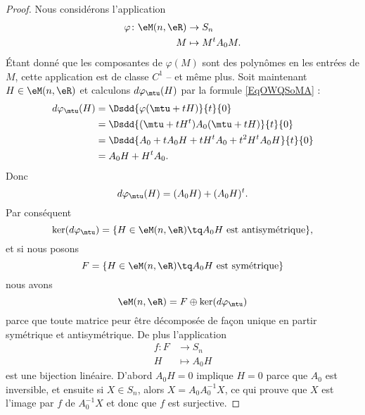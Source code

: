 \begin{proof}
    Nous considérons l'application
    \begin{equation}
        \begin{aligned}
            \varphi\colon \eM(n,\eR)&\to S_n \\
            M&\mapsto M^tA_0M.
        \end{aligned}
    \end{equation}
    Étant donné que les composantes de \( \varphi(M)\) sont des polynômes en les entrées de \( M\), cette application est de classe \( C^1\) -- et même plus. Soit maintenant \( H\in \eM(n,\eR)\) et calculons \( d\varphi_{\mtu}(H)\) par la formule \eqref{EqOWQSoMA} :
    \begin{subequations}
        \begin{align}
            d\varphi_{\mtu}(H)&=\Dsdd{ \varphi(\mtu+tH) }{t}{0}\\
            &=\Dsdd{ (\mtu+tH^t)A_0(\mtu+tH) }{t}{0}\\
            &=\Dsdd{ A_0+tA_0H+tH^tA_0+t^2H^tA_0H }{t}{0}\\
            &=A_0H+H^tA_0.
        \end{align}
    \end{subequations}
    Donc
    \begin{equation}
        d\varphi_{\mtu}(H)=(A_0H)+(A_0H)^t.
    \end{equation}
    Par conséquent
    \begin{equation}
        \ker(d\varphi_{\mtu})=\{ H\in \eM(n,\eR)\tq A_0H\text{ est antisymétrique} \},
    \end{equation}
    et si nous posons
    \begin{equation}
        F=\{ H\in \eM(n,\eR)\tq A_0H\text{ est symétrique} \}
    \end{equation}
    nous avons
    \begin{equation}
        \eM(n,\eR)=F\oplus\ker(d\varphi_{\mtu})
    \end{equation}
    parce que toute matrice peur être décomposée de façon unique en partir symétrique et antisymétrique. De plus l'application
    \begin{equation}    \label{EqGTBusDm}
        \begin{aligned}
            f\colon F&\to S_n \\
            H&\mapsto A_0H
        \end{aligned}
    \end{equation}
    est une bijection linéaire. D'abord \( A_0H=0\) implique \( H=0\) parce que \( A_0\) est inversible, et ensuite si \( X\in S_n\), alors \( X=A_0A_0^{-1}X\), ce qui prouve que \( X\) est l'image par \( f\) de \( A_0^{-1}X\) et donc que \( f\) est surjective.


\end{proof}
